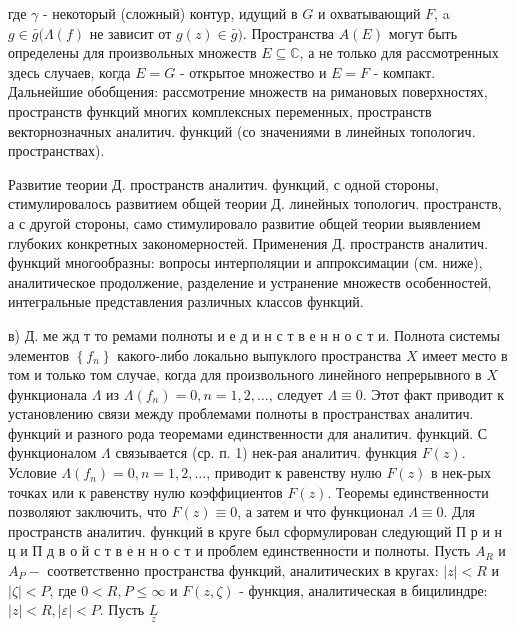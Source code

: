\documentclass[10pt]{article}
\begin{document}
где $\gamma$ - некоторый (сложный) контур, идущий в $G$ и охватывающий $F$, a $g \in \bar{g}(\Lambda(f)$ не зависит от $g(z) \in \bar{g})$. Пространства $A(E)$ могут быть определены для произвольных множеств $E \subseteq \mathbb{C}$, а не только для рассмотренных здесь случаев, когда $E=G$ - открытое множество и $E=F$ - компакт. Дальнейшие обобщения: рассмотрение множеств на римановых поверхностях, пространств функций многих комплексных переменных, пространств векторнозначных аналитич. функций (со значениями в линейных топологич. пространствах).



Развитие теории Д. пространств аналитич. функций, с одной стороны, стимулировалось развитием общей теории Д. линейных топологич. пространств, а с другой стороны, само стимулировало развитие общей теории выявлением глубоких конкретных закономерностей. Применения Д. пространств аналитич. функций многообразны: вопросы интерполяции и аппроксимации (см. ниже), аналитическое продолжение, разделение и устранение множеств особенностей, интегральные представления различных классов функций.



в) Д. ме жд т то ремами полноты и е д и н с т в е н н о с т и. Полнота системы элементов $\left\{f_{n}\right\}$ какого-либо локально выпуклого пространства $X$ имеет место в том и только том случае, когда для произвольного линейного непрерывного в $X$ функционала $\Lambda$ из $\Lambda\left(f_{n}\right)=0, n=1,2, \ldots$, следует $\Lambda \equiv 0$. Этот факт приводит к установлению связи между проблемами полноты в пространствах аналитич. функциӥ и разного рода теоремами единственности для аналитич. функций. С функционалом $\Lambda$ связывается (ср. п. 1) нек-рая аналитич. функция $F(z)$. Условие $\Lambda\left(f_{n}\right)=0, n=1,2, \ldots$, приводит к равенству нулю $F(z)$ в нек-рых точках или к равенству нулю коэффициентов $F(z)$. Теоремы единственности позволяют заключить, что $F(z) \equiv 0$, а затем и что функционал $\Lambda \equiv 0$. Для пространств аналитич. функций в круге был сформулирован следующий П р и н ц и П д в о й с т в е н н о с т и проблем единственности и полноты. Пусть $A_{R}$ и $A_{P}-$ соответственно пространства функций, аналитических в кругах: $|z|<R$ и $|\zeta|<P$, где $0<R, P \leqslant \infty$ и $F(z, \zeta)$ - функция, аналитическая в бицилиндре: $|z|<R,|\varepsilon|<P$. Пусть $\underset{z}{L}$
\end{document}
